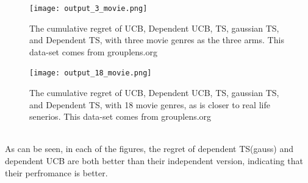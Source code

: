 \documentclass{article}
\begin{document}
\begin{homeworkProblem}
\begin{enumerate}
\begin{figure}[htp]
            \texttt{[image: output\_3\_movie.png]}
            \caption{The cumulative regret of UCB, Dependent UCB, TS, gaussian TS, and Dependent TS, with three movie genres as the three arms. This data-set comes from grouplens.org}
            \label{fig2}
        \end{figure}
        \begin{figure}[htp]
            \centering
            \texttt{[image: output\_18\_movie.png]}
            \caption{The cumulative regret of UCB, Dependent UCB, TS, gaussian TS, and Dependent TS, with 18 movie genres, as is closer to real life senerios. This data-set comes from grouplens.org}
            \label{fig3}
        \end{figure}\\
        
        As can be seen, in each of the figures, the regret of dependent TS(gauss) and dependent UCB are both better than their independent version, indicating that their perfromance is better.
    \end{enumerate}
\end{homeworkProblem}
\pagebreak
\pagebreak
\end{document}
